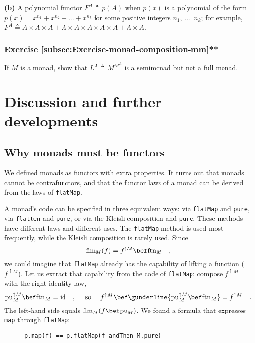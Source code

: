 \textbf{(b)} A polynomial functor $F^{A}\triangleq p(A)$ when $p(x)$
is a polynomial of the form $p(x)=x^{n_{1}}+x^{n_{2}}+...+x^{n_{k}}$
for some positive integers $n_{1}$, ..., $n_{k}$; for example, $F^{A}\triangleq A\times A\times A+A\times A\times A\times A\times A+A\times A$. 

\subsubsection{Exercise \label{subsec:Exercise-monad-composition-mm}\ref{subsec:Exercise-monad-composition-mm}{*}{*}}

If $M$ is a monad, show that $L^{A}\triangleq M^{M^{A}}$ is a semimonad
but not a full monad.

\section{Discussion and further developments}

\subsection{Why monads must be functors}

We defined monads as functors with extra properties. It turns out
that monads cannot be contrafunctors, and that the functor laws of
a monad can be derived from the laws of \lstinline!flatMap!.

A monad\textsf{'}s code can be specified in three equivalent ways: via \lstinline!flatMap!
and \lstinline!pure!, via \lstinline!flatten! and \lstinline!pure!,
or via the Kleisli composition and \lstinline!pure!. These methods
have different laws and different uses. The \lstinline!flatMap! method
is used most frequently, while the Kleisli composition is rarely used.
Since
\[
\text{flm}_{M}(f)=f^{\uparrow M}\bef\text{ftn}_{M}\quad,
\]
we could imagine that \lstinline!flatMap! already has the capability
of lifting a function ($f^{\uparrow M}$). Let us extract that capability
from the code of \lstinline!flatMap!: compose $f^{\uparrow M}$ with
the right identity law,
\[
\text{pu}_{M}^{\uparrow M}\bef\text{ftn}_{M}=\text{id}\quad,\quad\text{ so }\quad f^{\uparrow M}\bef\gunderline{\text{pu}_{M}^{\uparrow M}\bef\text{ftn}_{M}}=f^{\uparrow M}\quad.
\]
The left-hand side equals $\text{flm}_{M}(f\bef\text{pu}_{M})$. We
found a formula that expresses \lstinline!map! through \lstinline!flatMap!:

\begin{wrapfigure}{l}{0.5\columnwidth}%
\vspace{-0.5\baselineskip}
\begin{lstlisting}
p.map(f) == p.flatMap(f andThen M.pure)
\end{lstlisting}

\vspace{-0.5\baselineskip}
\end{wrapfigure}%


